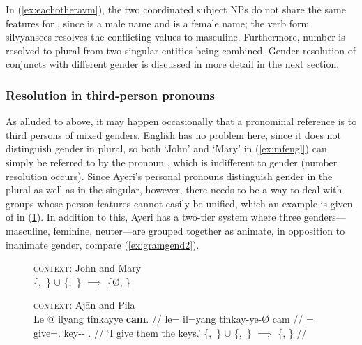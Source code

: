 In (\ref{ex:eachotheravm}), the two coordinated subject NPs do not share the
same features for \Gend{}, since  is a male name and
 is a female name; the verb form 
{silvyan}{sees} resolves the conflicting values to masculine. Furthermore,
number is resolved to plural from two singular entities being combined.
Gender resolution of conjuncts with different gender is discussed in more
detail in the next section.

\subsubsection{Resolution in third-person pronouns}
\label{subsubsec:resolution}


As alluded to above, it may happen occasionally that a pronominal reference is
to third persons of mixed genders. English has no problem here, since it does
not distinguish gender in plural, so both `John' and `Mary' in
(\ref{ex:mfengl}) can simply be referred to by the pronoun , which is
indifferent to gender (number resolution occurs). Since Ayeri's personal
pronouns distinguish gender in the plural as well as in the singular, however,
there needs to be a way to deal with groups whose person features cannot easily
be unified, which an example is given of in (\ref{ex:mfayeri}). In addition to
this, Ayeri has a two-tier system where three genders---masculine, feminine,
neuter---are grouped together as animate, in opposition to inanimate
gender, compare (\ref{ex:gramgend2}).

\begin{figure}
\pex
\a\label{ex:mfengl}%
	\textsc{context:} John and Mary \medskip \\
	\hfill \{\M{},~\Sg{}\} $\cup$  \{\F{},~\Sg{}\} $\implies$ \{Ø, \Pl\}

\a\label{ex:mfayeri}%
	\textsc{context:} Ajān and Pila \medskip \\
	\begingl
	\gla Le @ ilyang tinkayye \textbf{cam}. //
	\glb le= il=yang tinkay-ye-Ø cam //
	\glc \PatTI{}= give=\Fsg{}.\Aarg{} key-\Pl{}-\Top{} \TplM{}.\Dat{} //
	\glft `I give them the keys.' 
	\hfill \{\M{},~\Sg{}\} $\cup$ \{\F{},~\Sg{}\} $\implies$ \{\M, \Pl\} //
	\endgl
\xe
\end{figure}

